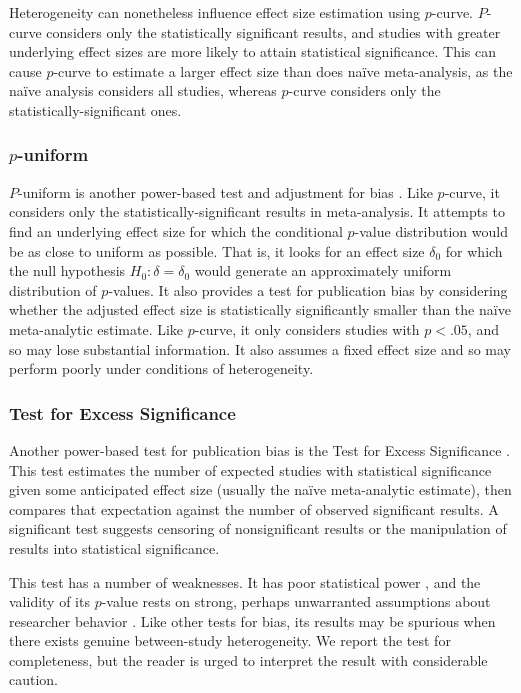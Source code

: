 \documentclass[man, mask]{apa6}
\begin{document}
Heterogeneity can nonetheless influence effect size estimation using $p$-curve. $P$-curve considers only the statistically significant results, and studies with greater underlying effect sizes are more likely to attain statistical significance. This can cause $p$-curve to estimate a larger effect size than does na{\"i}ve meta-analysis, as the na{\"i}ve analysis considers all studies, whereas $p$-curve considers only the statistically-significant ones. 

\subsubsection{$p$-uniform}
$P$-uniform is another power-based test and adjustment for bias \citep{vanAssen:etal:2015}. Like $p$-curve, it considers only the statistically-significant results in meta-analysis. It attempts to find an underlying effect size for which the conditional $p$-value distribution would be as close to uniform as possible. That is, it looks for an effect size $\delta_0$ for which the null hypothesis $H_0: \delta = \delta_0$ would generate an approximately uniform distribution of $p$-values. It also provides a test for publication bias by considering whether the adjusted effect size is statistically significantly smaller than the na{\"i}ve meta-analytic estimate. Like $p$-curve, it only considers studies with $p < .05$, and so may lose substantial information. It also assumes a fixed effect size and so may perform poorly under conditions of heterogeneity.   

\subsubsection{Test for Excess Significance}
Another power-based test for publication bias is the Test for Excess Significance \citep{Ioannidis:Trikalinos:2007}. This test estimates the number of expected studies with statistical significance given some anticipated effect size (usually the na{\"i}ve meta-analytic estimate), then compares that expectation against the number of observed significant results. A significant test suggests censoring of nonsignificant results or the manipulation of results into statistical significance.

This test has a number of weaknesses. It has poor statistical power \citep{Ioannidis:Trikalinos:2007}, and the validity of its $p$-value rests on strong, perhaps unwarranted assumptions about researcher behavior \citep{Morey:2013}. Like other tests for bias, its results may be spurious when there exists genuine between-study heterogeneity. We report the test for completeness, but the reader is urged to interpret the result with considerable caution.
\end{document}
